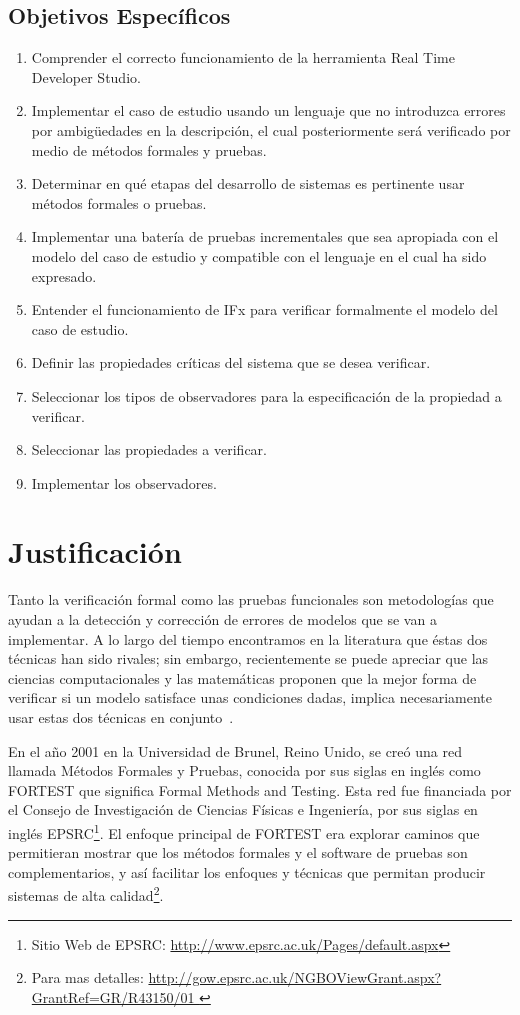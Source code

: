 \subsection{Objetivos Espec\'ificos}
\begin{enumerate}
 \item Comprender el correcto funcionamiento de la herramienta Real Time 
Developer Studio.
\item Implementar el caso de estudio usando un lenguaje que no introduzca 
errores por ambig\"uedades en la descripci\'on, el cual posteriormente ser\'a 
verificado por medio de m\'etodos formales y pruebas.
\item Determinar en qu\'e etapas del desarrollo de sistemas es pertinente usar 
m\'etodos formales o pruebas.
\item Implementar una bater\'ia de pruebas incrementales que sea apropiada con 
el modelo del caso de estudio y compatible con el lenguaje en el cual ha sido 
expresado.
\item Entender el funcionamiento de IFx para verificar formalmente el modelo 
del caso de estudio.
\item Definir las propiedades cr\'iticas del sistema que se desea verificar.
\item Seleccionar los tipos de observadores para la especificaci\'on de la 
propiedad a verificar.
\item Seleccionar las propiedades a verificar.
\item Implementar los observadores.
\end{enumerate}

\section{Justificaci\'on}

Tanto la verificaci\'on formal como las pruebas funcionales son metodolog\'ias 
que ayudan a la detecci\'on y correcci\'on de errores de modelos que se van a 
implementar. A lo largo del tiempo encontramos en la literatura que \'estas dos 
t\'ecnicas han sido rivales; sin embargo, recientemente se puede apreciar 
que las ciencias computacionales y las matem\'aticas proponen que la mejor forma 
de verificar si un modelo satisface unas condiciones dadas, implica 
necesariamente usar estas dos t\'ecnicas en conjunto~\cite{Gaudel1996}. 

En el a\~no 2001 en la Universidad de Brunel, Reino Unido, se cre\'o una red 
llamada M\'etodos Formales y Pruebas, conocida por sus siglas en ingl\'es como 
FORTEST que significa Formal Methods and Testing. Esta red fue financiada por el 
Consejo de Investigaci\'on de Ciencias F\'isicas e Ingenier\'ia, por sus siglas 
en ingl\'es EPSRC\footnote{Sitio Web de 
EPSRC: \url{http://www.epsrc.ac.uk/Pages/default.aspx}}. El enfoque principal 
de 
FORTEST era explorar caminos que 
permitieran mostrar que los m\'etodos formales y el software de pruebas son 
complementarios, y as\'i facilitar los enfoques y t\'ecnicas 	que permitan 
producir sistemas de alta 
calidad\footnote{Para mas detalles:
\url{http://gow.epsrc.ac.uk/NGBOViewGrant.aspx?GrantRef=GR/R43150/01 
}}.

